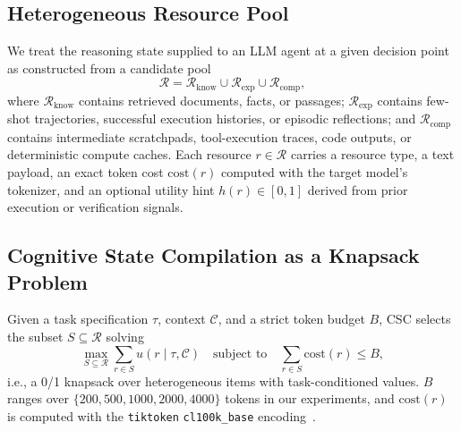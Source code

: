 \documentclass{article}
\begin{document}
\subsection{Heterogeneous Resource Pool}
We treat the reasoning state supplied to an LLM agent at a given decision point as constructed from a candidate pool
\[
\mathcal{R} = \mathcal{R}_{\text{know}} \cup \mathcal{R}_{\text{exp}} \cup \mathcal{R}_{\text{comp}},
\]
where $\mathcal{R}_{\text{know}}$ contains retrieved documents, facts, or passages; $\mathcal{R}_{\text{exp}}$ contains few-shot trajectories, successful execution histories, or episodic reflections; and $\mathcal{R}_{\text{comp}}$ contains intermediate scratchpads, tool-execution traces, code outputs, or deterministic compute caches. Each resource $r \in \mathcal{R}$ carries a resource type, a text payload, an exact token cost $\text{cost}(r)$ computed with the target model's tokenizer, and an optional utility hint $h(r) \in [0,1]$ derived from prior execution or verification signals.

\subsection{Cognitive State Compilation as a Knapsack Problem}
Given a task specification $\tau$, context $\mathcal{C}$, and a strict token budget $B$, CSC selects the subset $S \subseteq \mathcal{R}$ solving
\begin{equation}
\label{eq:knapsack}
\max_{S \subseteq \mathcal{R}} \sum_{r \in S} u(r \mid \tau, \mathcal{C}) \quad \text{subject to} \quad \sum_{r \in S} \text{cost}(r) \le B,
\end{equation}
i.e., a 0/1 knapsack over heterogeneous items with task-conditioned values. $B$ ranges over $\{200, 500, 1000, 2000, 4000\}$ tokens in our experiments, and $\text{cost}(r)$ is computed with the \texttt{tiktoken} \texttt{cl100k\_base} encoding~\citep{tiktoken}.
\end{document}
